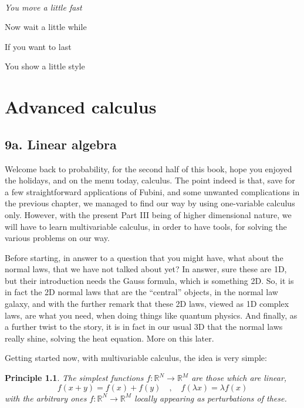 \documentclass[12pt]{amsbook}
\newtheorem{principle}[theorem]{Principle}
\begin{document}
\ \vskip50mm

\begin{center}
{\em You move a little fast

Now wait a little while

If you want to last

You show a little style}
\end{center}

\chapter{Advanced calculus}

\section*{9a. Linear algebra}

Welcome back to probability, for the second half of this book, hope you enjoyed the holidays, and on the menu today, calculus. The point indeed is that, save for a few straightforward applications of Fubini, and some unwanted complications in the previous chapter, we managed to find our way by using one-variable calculus only. However, with the present Part III being of higher dimensional nature, we will have to learn multivariable calculus, in order to have tools, for solving the various problems on our way.

\bigskip

Before starting, in answer to a question that you might have, what about the normal laws, that we have not talked about yet? In answer, sure these are 1D, but their introduction needs the Gauss formula, which is something 2D. So, it is in fact the 2D normal laws that are the ``central'' objects, in the normal law galaxy, and with the further remark that these 2D laws, viewed as 1D complex laws, are what you need, when doing things like quantum physics. And finally, as a further twist to the story, it is in fact in our usual 3D that the normal laws really shine, solving the heat equation. More on this later.

\bigskip

Getting started now, with multivariable calculus, the idea is very simple:

\begin{principle}
The simplest functions $f:\mathbb R^N\to\mathbb R^M$ are those which are linear,
$$f(x+y)=f(x)+f(y)\quad,\quad f(\lambda x)=\lambda f(x)$$
with the arbitrary ones $f:\mathbb R^N\to\mathbb R^M$ locally appearing as perturbations of these.
\end{principle}
\end{document}
